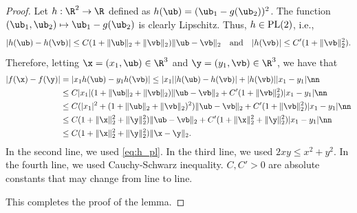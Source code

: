 \begin{proof}
Let $h:\R^2\rightarrow\R$ defined as $h(\ub)=(\ub_1-g(\ub_2))^2$. The function $(\ub_1,\ub_2)\mapsto\ub_1-g(\ub_2)$ is clearly Lipschitz. Thus, $h\in\rm{PL}(2)$, i.e., 
\begin{align}
|h(\ub)-h(\vb)| \leq C(1+\|\ub\|_2+\|\vb\|_2)\|\ub-\vb\|_2\quad\text{and}\quad |h(\vb)|\leq C'(1+\|\vb\|_2^2).\label{eq:h_pl}
\end{align} 
Therefore, letting $\x=(x_1,\ub)\in\R^3$ and $\y=(y_1,\vb)\in\R^3$, we have that 
\begin{align}
|f(\x)-f(\y)| &= |x_1h(\ub) - y_1h(\vb)| \leq |x_1||h(\ub)-h(\vb)| + |h(\vb)| |x_1-y_1|\nn\\
&\leq C|x_1|(1+\|\ub\|_2+\|\vb\|_2)\|\ub-\vb\|_2 + C'(1+\|\vb\|_2^2)|x_1-y_1| \nn\\
&\leq C(|x_1|^2+(1+\|\ub\|_2+\|\vb\|_2)^2)\|\ub-\vb\|_2 + C'(1+\|\vb\|_2^2)|x_1-y_1| \nn\\
&\leq C(1+\|\x\|_2^2+\|\y\|_2^2)\|\ub-\vb\|_2 + C'(1+\|\x\|_2^2+\|\y\|_2^2)|x_1-y_1| \nn\\
&\leq C(1+\|\x\|_2^2+\|\y\|_2^2)\|\x-\y\|_2.
\end{align}
In the second line, we used \eqref{eq:h_pl}. In the third line, we used $2xy\leq x^2+y^2$. In the fourth line, we used Cauchy-Schwarz inequality. $C,C'>0$ are absolute constants that may change from line to line.

This completes the proof of the lemma.
\end{proof}

